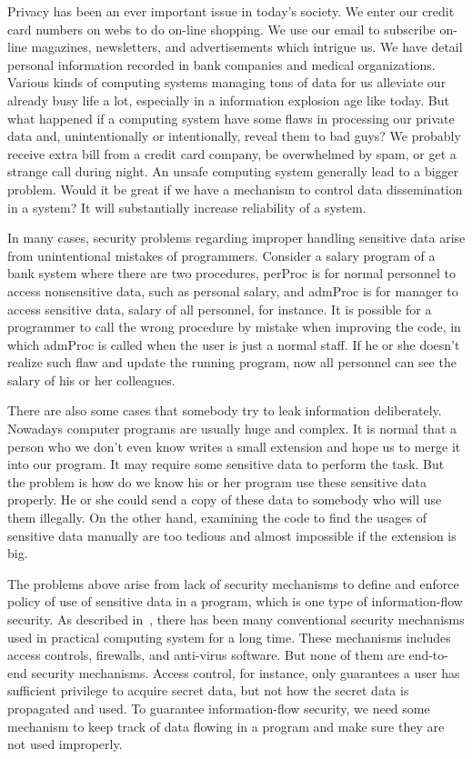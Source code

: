 
Privacy has been an ever important issue in today's society. We enter our 
credit card numbers on webs to do on-line shopping. We use our email to
subscribe on-line magazines, newsletters, and advertisements which intrigue us.
We have detail personal information recorded in bank companies and medical
organizations. Various kinds of computing systems managing tons of
data for us alleviate our already busy life a lot, especially in a
information explosion age like today. But what happened if a computing 
system have some flaws in processing our private data and, unintentionally
or intentionally, reveal them to bad guys? We probably receive extra bill from
a credit card company, be overwhelmed by spam, or get a strange call during night.
An unsafe computing system generally lead to a bigger problem. Would it 
be great if we have a mechanism to control data dissemination in
a system? It will substantially increase reliability of a system.

In many cases, security problems regarding improper handling sensitive data 
arise from unintentional mistakes of programmers.
Consider a salary program of a bank system where there are two procedures, 
perProc is for normal personnel to access nonsensitive data, such as personal 
salary, and admProc is for manager to access sensitive data, salary of all
personnel, for instance. It is possible for a programmer to call the wrong
procedure by mistake when improving the code, in which admProc is called 
when the user is just a normal staff. If he or she doesn't realize
such flaw and update the running program, now all personnel can see the 
salary of his or her colleagues.

There are also some cases that somebody try to leak information
deliberately. Nowadays computer programs 
are usually huge and complex. It is normal that a person who we don't even
know writes a small extension and hope us to merge it into our program. 
It may require some sensitive data to perform the task. But the problem is
how do we know his or her program use these sensitive data properly. He or she
could send a copy of these data to somebody who will use them illegally. 
On the other hand, examining the code to find the usages of sensitive data
manually are too tedious and almost impossible if the extension is big.

The problems above arise from lack of security mechanisms to define and enforce
policy of use of sensitive data in a program, which is one type of information-flow 
security. As described in~\cite{Sabelfeld:Myers:JSAC},
there has been many conventional security mechanisms used in practical 
computing system for a long time. These mechanisms includes access controls, 
firewalls, and anti-virus software. But none of them are end-to-end security 
mechanisms. Access control, for instance, only guarantees a user has sufficient 
privilege to acquire secret data, but not how the secret data is propagated 
and used. To guarantee information-flow security, we need some mechanism to
keep track of data flowing in a program and make sure they are not used
improperly.

